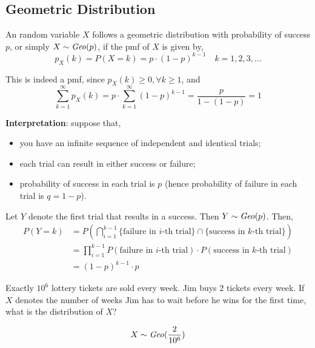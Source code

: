 \subsection{Geometric Distribution}
\begin{definition}
    An random variable $X$ follows a geometric distribution with probability of
success $p$, or simply $X \sim \text{\emph{Geo}}(p)$, if the pmf of $X$ is given
by, 
    \[ p_X(k) = P(X = k) = p \cdot (1-p)^{k - 1} \quad k = 1, 2, 3, \dots \]
\end{definition}
This is indeed a pmf, since $p_X(k) \geq 0, \forall k \geq 1$, and 
    \[ \sum_{k = 1}^\infty p_X(k) = p \cdot \sum_{k = 1}^\infty (1 - p)^{k - 1}
                                  = \frac{p}{1 - (1 - p)}
                                  = 1                                        \]

\noindent
\textbf{Interpretation}: suppose that, 
\begin{itemize}[noitemsep, topsep=0em]
    \item you have an infinite sequence of independent and identical trials;
    \item each trial can result in either success or failure;
    \item probability of success in each trial is $p$ (hence probability of
          failure in each trial is $q = 1-p$).
\end{itemize}
Let $Y$ denote the first trial that results in a success. Then $Y \sim
\text{\emph{Geo}}(p)$. Then, 
\begin{align*}
    P(Y = k) &= P( \bigcap_{i=1}^{k-1} \lbrace \text{failure in $i$-th trial}
                \rbrace \cap \lbrace \text{success in $k$-th trial} \rbrace) \\
             &= \prod_{i=1}^{k - 1} P(\text{failure in $i$-th trial}) \cdot 
                P(\text{success in $k$-th trial})                            \\
             &= (1-p)^{k-1} \cdot p
\end{align*}

\begin{example}
    Exactly $10^6$ lottery tickets are sold every week. Jim buys $2$ tickets
every week. If $X$ denotes the number of weeks Jim has to wait before he wins
for the first time, what is the distribution of $X$?
\end{example}
\begin{solution}
    \[ X \sim \text{\emph{Geo}}(\frac{2}{10^6}) \]
\end{solution}

